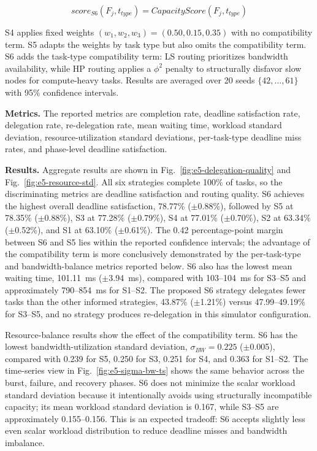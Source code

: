 \documentclass[conference]{IEEEtran}
\begin{document}
    \begin{equation}
    score_{S6}(F_j,t_{type}) = CapacityScore(F_j,t_{type})
    \label{eq:s6-score}
    \end{equation}

    S4 applies fixed weights $(w_1,w_2,w_3)=(0.50,0.15,0.35)$ with no compatibility term. S5 adapts the weights by task type but also omits the compatibility term. S6 adds the task-type compatibility term: LS routing prioritizes bandwidth availability, while HP routing applies a $\phi^2$ penalty to structurally disfavor slow nodes for compute-heavy tasks. Results are averaged over 20 seeds $\{42,\ldots,61\}$ with 95\% confidence intervals.

    \textbf{Metrics.} The reported metrics are completion rate, deadline satisfaction rate, delegation rate, re-delegation rate, mean waiting time, workload standard deviation, resource-utilization standard deviations, per-task-type deadline miss rates, and phase-level deadline satisfaction.

    \textbf{Results.} Aggregate results are shown in Fig.~\ref{fig:e5-delegation-quality} and Fig.~\ref{fig:e5-resource-std}. All six strategies complete 100\% of tasks, so the discriminating metrics are deadline satisfaction and routing quality. S6 achieves the highest overall deadline satisfaction, 78.77\% ($\pm$0.88\%), followed by S5 at 78.35\% ($\pm$0.88\%), S3 at 77.28\% ($\pm$0.79\%), S4 at 77.01\% ($\pm$0.70\%), S2 at 63.34\% ($\pm$0.52\%), and S1 at 63.10\% ($\pm$0.61\%). The 0.42 percentage-point margin between S6 and S5 lies within the reported confidence intervals; the advantage of the compatibility term is more conclusively demonstrated by the per-task-type and bandwidth-balance metrics reported below. S6 also has the lowest mean waiting time, 101.11~ms ($\pm$3.94~ms), compared with 103--104~ms for S3--S5 and approximately 790--854~ms for S1--S2. The proposed S6 strategy delegates fewer tasks than the other informed strategies, 43.87\% ($\pm$1.21\%) versus 47.99--49.19\% for S3--S5, and no strategy produces re-delegation in this simulator configuration.

    Resource-balance results show the effect of the compatibility term. S6 has the lowest bandwidth-utilization standard deviation, $\sigma_{BW}=0.225$ ($\pm$0.005), compared with 0.239 for S5, 0.250 for S3, 0.251 for S4, and 0.363 for S1--S2. The time-series view in Fig.~\ref{fig:e5-sigma-bw-ts} shows the same behavior across the burst, failure, and recovery phases. S6 does not minimize the scalar workload standard deviation because it intentionally avoids using structurally incompatible capacity; its mean workload standard deviation is 0.167, while S3--S5 are approximately 0.155--0.156. This is an expected tradeoff: S6 accepts slightly less even scalar workload distribution to reduce deadline misses and bandwidth imbalance.
\end{document}
